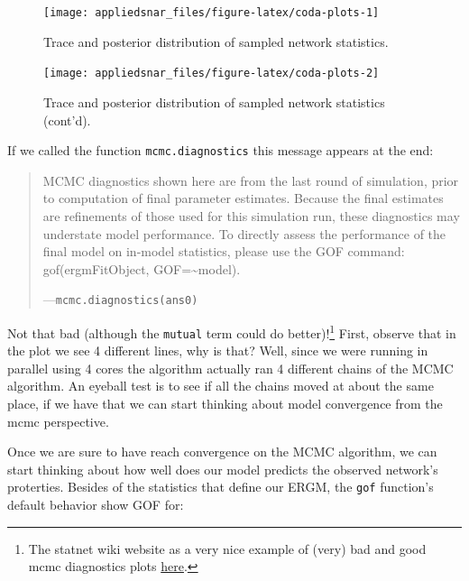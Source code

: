 \documentclass[]{book}
\let\rmarkdownfootnote\footnote%
\def\footnote{\protect\rmarkdownfootnote}
\theoremstyle{definition}
\theoremstyle{definition}
\theoremstyle{definition}
\theoremstyle{remark}
\begin{document}
\begin{figure}[!h]

{\centering \texttt{[image: appliedsnar\_files/figure-latex/coda-plots-1]} 

}

\caption{Trace and posterior distribution of sampled network statistics.}\label{fig:coda-plots1}
\end{figure}\begin{figure}[!h]

{\centering \texttt{[image: appliedsnar\_files/figure-latex/coda-plots-2]} 

}

\caption{Trace and posterior distribution of sampled network statistics (cont'd).}\label{fig:coda-plots2}
\end{figure}

If we called the function \texttt{mcmc.diagnostics} this message appears
at the end:

\begin{quote}
MCMC diagnostics shown here are from the last round of simulation, prior
to computation of final parameter estimates. Because the final estimates
are refinements of those used for this simulation run, these diagnostics
may understate model performance. To directly assess the performance of
the final model on in-model statistics, please use the GOF command:
gof(ergmFitObject, GOF=\textasciitilde{}model).

---\texttt{mcmc.diagnostics(ans0)}
\end{quote}

Not that bad (although the \texttt{mutual} term could do
better)!\footnote{The statnet wiki website as a very nice example of
  (very) bad and good mcmc diagnostics plots
  \href{https://statnet.org/trac/raw-attachment/wiki/Resources/ergm.fit.diagnostics.pdf}{here}.}
First, observe that in the plot we see 4 different lines, why is that?
Well, since we were running in parallel using 4 cores the algorithm
actually ran 4 different chains of the MCMC algorithm. An eyeball test
is to see if all the chains moved at about the same place, if we have
that we can start thinking about model convergence from the mcmc
perspective.

Once we are sure to have reach convergence on the MCMC algorithm, we can
start thinking about how well does our model predicts the observed
network's proterties. Besides of the statistics that define our ERGM,
the \texttt{gof} function's default behavior show GOF for:
\end{document}

